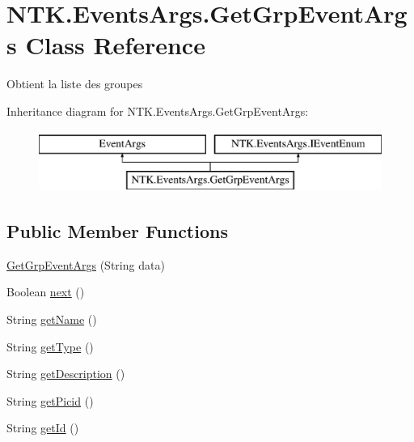 \hypertarget{class_n_t_k_1_1_events_args_1_1_get_grp_event_args}{}\section{N\+T\+K.\+Events\+Args.\+Get\+Grp\+Event\+Args Class Reference}
\label{class_n_t_k_1_1_events_args_1_1_get_grp_event_args}


Obtient la liste des groupes  


Inheritance diagram for N\+T\+K.\+Events\+Args.\+Get\+Grp\+Event\+Args\+:\begin{figure}[H]
\begin{center}
\leavevmode
\includegraphics[height=2.000000cm]{db/d21/class_n_t_k_1_1_events_args_1_1_get_grp_event_args}
\end{center}
\end{figure}
\subsection*{Public Member Functions}
\begin{DoxyCompactItemize}
\item 
\mbox{\hyperlink{class_n_t_k_1_1_events_args_1_1_get_grp_event_args_a1ff8371f075d13b1f032bc928c0dd8e7}{Get\+Grp\+Event\+Args}} (String data)
\item 
Boolean \mbox{\hyperlink{class_n_t_k_1_1_events_args_1_1_get_grp_event_args_aa65b34fcf234ffa122c715bf3740e3ed}{next}} ()
\item 
String \mbox{\hyperlink{class_n_t_k_1_1_events_args_1_1_get_grp_event_args_a8fab473bcc6838b785d9d134fe83df92}{get\+Name}} ()
\item 
String \mbox{\hyperlink{class_n_t_k_1_1_events_args_1_1_get_grp_event_args_a16a546227ad59bc6ceb80a6c76f1bd7a}{get\+Type}} ()
\item 
String \mbox{\hyperlink{class_n_t_k_1_1_events_args_1_1_get_grp_event_args_acead1ffdc63c51367c99979f5fd27c86}{get\+Description}} ()
\item 
String \mbox{\hyperlink{class_n_t_k_1_1_events_args_1_1_get_grp_event_args_a5a6916e22afd1624943c652c4c931c1b}{get\+Picid}} ()
\item 
String \mbox{\hyperlink{class_n_t_k_1_1_events_args_1_1_get_grp_event_args_af7f2f0deae86c4af8aeeb288de1c511b}{get\+Id}} ()
\end{DoxyCompactItemize}


